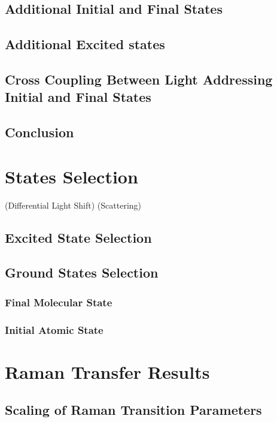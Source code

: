 \subsection{Additional Initial and Final States}

\subsection{Additional Excited states}

\subsection{Cross Coupling Between Light Addressing Initial and Final States}

\subsection{Conclusion}

\section{States Selection}

(Differential Light Shift)
(Scattering)

\subsection{Excited State Selection}

\subsection{Ground States Selection}

\subsubsection{Final Molecular State}

\subsubsection{Initial Atomic State}

\section{Raman Transfer Results}

\subsection{Scaling of Raman Transition Parameters}
